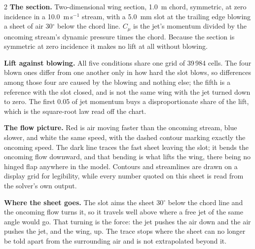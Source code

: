 \documentclass[8pt,a4paper]{extarticle}
\newcommand{\role}[1]{{\color{navy}\bfseries #1.}}
\begin{document}
\begin{multicols}{2}
\role{The section} Two-dimensional wing section, 1.0~m chord, symmetric, at
zero incidence in a 10.0~m\,s$^{-1}$ stream, with a 5.0~mm slot at the
trailing edge blowing a sheet of air 30$^\circ$ below the chord line. $C_\mu$
is the jet's momentum divided by the oncoming stream's dynamic pressure times
the chord. Because the section is symmetric at zero incidence it makes no lift
at all without blowing.

\role{Lift against blowing} All five conditions share one grid of 39\,984
cells. The four blown ones differ from one another only in how hard the slot
blows, so differences among those four are caused by the blowing and nothing
else; the fifth is a reference with the slot closed, and is not the same wing
with the jet turned down to zero. The first 0.05 of jet momentum buys a
disproportionate share of the lift, which is the square-root law read off the
chart.

\role{The flow picture} Red is air moving faster than the oncoming stream,
blue slower, and white the same speed, with the dashed contour marking exactly
the oncoming speed. The dark line traces the fast sheet leaving the slot; it
bends the oncoming flow downward, and that bending is what lifts the wing,
there being no hinged flap anywhere in the model. Contours and streamlines are
drawn on a display grid for legibility, while every number quoted on this sheet
is read from the solver's own output.

\role{Where the sheet goes} The slot aims the sheet 30$^\circ$ below the
chord line and the oncoming flow turns it, so it travels well above where a
free jet of the same angle would go. That turning is the force: the jet pushes
the air down and the air pushes the jet, and the wing, up. The trace stops
where the sheet can no longer be told apart from the surrounding air and is not
extrapolated beyond it.
\end{multicols}
\end{document}
